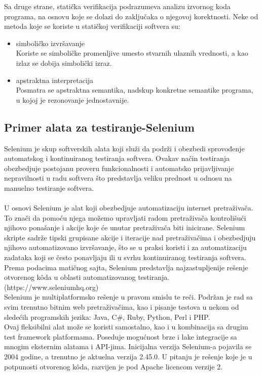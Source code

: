 \documentclass[a4paper]{article}
\begin{document}
Sa druge strane, statička verifikacija podrazumeva analizu izvornog koda programa, na osnovu koje se dolazi do zaključaka o njegovoj korektnosti.
Neke od metoda koje se koriste u statičkoj verifikaciji softvera su:
\begin{itemize}
\item simboličko izvršavanje \cite{symbolic_execution}\\
Koriste se simboličke promenljive umesto stvarnih ulaznih vrednosti, a kao izlaz se dobija simbolički izraz.
\item apstraktna interpretacija \cite{abstract_interpretation}\\
Posmatra se apstraktna semantika, nadskup konkretne semantike programa, u kojoj je rezonovanje jednostavnije.

\end{itemize}

\subsection{Primer alata za testiranje-Selenium}
\label{subsec:primer_alata}
Selenium je skup softverskih alata koji služi da podrži i obezbedi sprovođenje automatskog i kontinuiranog testiranja softvera. Ovakav način testiranja obezbedjuje postojanu proveru funkcionalnosti i automatsko prijavljivanje nepravilnosti u radu softvera što predstavlja veliku prednost u odnosu na manuelno testiranje softvera.\\
\\
U osnovi Selenium je alat koji obezbedjuje automatizaciju internet pretraživača. To znači da pomoću njega možemo upravljati radom pretraživača kontrolišući njihovo ponašanje i akcije koje će unutar pretraživača biti inicirane. Selenium skripte sadrže tipski grupisane akcije i iteracije nad pretraživačima i obezbedjuju njihovo automatizovano izvršavanje, što se u praksi koristi i za automatizaciju zadataka koji se često ponavljaju ili u svrhu kontinuiranog testiranja softvera. Prema podacima matičnog sajta, Selenium predstavlja najzastupljenije rešenje otvorenog  k\^{o}da u oblasti automatizovanog testiranja.(https://www.seleniumhq.org)
\\
Selenium je multiplatformsko rešenje u pravom smislu te reči. Podržan je rad sa svim trenutno bitnim web pretraživačima, kao i pisanje testova u nekom od sledećih programskih jezika: Java, C\#, Ruby, Python, Perl i PHP.
\\
Ovaj fleksibilni alat može se koristi samostalno, kao i u kombinacija sa drugim test framework platformama. Poseduje mogućnost brze i lake integracije sa mnogim eksternim alatama i API-jima. Inicijalna verzija Selenium-a pojavila se 2004 godine, a trenutno je aktuelna verzija 2.45.0. U pitanju je rešenje koje je u potpunosti otvorenog  k\^{o}da, razvijen je pod Apache licencom verzije 2.
\\
\end{document}
